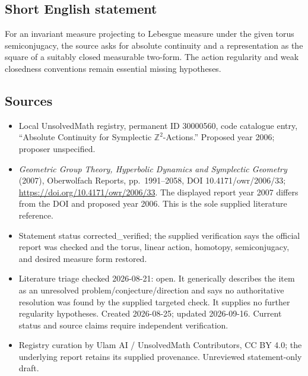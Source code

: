 \documentclass[11pt]{article}
\newcommand{\Z}{\mathbb{Z}}
\begin{document}
\subsection{Short English statement}
For an invariant measure projecting to Lebesgue measure under the given torus semiconjugacy, the source asks for absolute continuity and a representation as the square of a suitably closed measurable two-form. The action regularity and weak closedness conventions remain essential missing hypotheses.
\subsection{Sources}
\begin{itemize}
\item Local UnsolvedMath registry, permanent ID 30000560, code catalogue entry, ``Absolute Continuity for Symplectic $\Z^2$-Actions.'' Proposed year 2006; proposer unspecified.
\item \emph{Geometric Group Theory, Hyperbolic Dynamics and Symplectic Geometry} (2007), Oberwolfach Reports, pp.\ 1991--2058, DOI 10.4171/owr/2006/33; \url{https://doi.org/10.4171/owr/2006/33}. The displayed report year 2007 differs from the DOI and proposed year 2006. This is the sole supplied literature reference.
\item Statement status corrected\_verified; the supplied verification says the official report was checked and the torus, linear action, homotopy, semiconjugacy, and desired measure form restored.
\item Literature triage checked 2026-08-21: open. It generically describes the item as an unresolved problem/conjecture/direction and says no authoritative resolution was found by the supplied targeted check. It supplies no further regularity hypotheses. Created 2026-08-25; updated 2026-09-16. Current status and source claims require independent verification.
\item Registry curation by Ulam AI / UnsolvedMath Contributors, CC BY 4.0; the underlying report retains its supplied provenance. Unreviewed statement-only draft.
\end{itemize}
\end{document}

